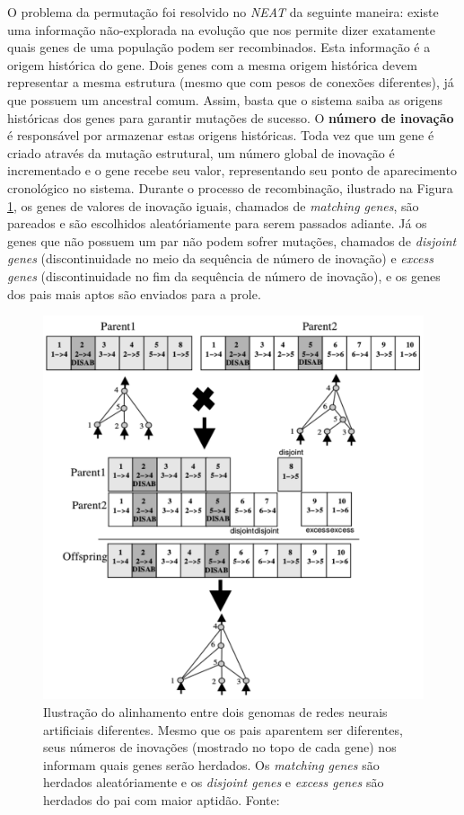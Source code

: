 O problema da permutação foi resolvido no \textit{NEAT} da seguinte maneira:
existe uma informação não-explorada na evolução que nos permite dizer exatamente
quais genes de uma população podem ser recombinados. Esta informação é a origem
histórica do gene. Dois genes com a mesma origem histórica devem representar a
mesma estrutura (mesmo que com pesos de conexões diferentes), já que possuem um
ancestral comum. Assim, basta que o sistema saiba as origens históricas dos
genes para garantir mutações de sucesso.  O \textbf{número de inovação} é
responsável por armazenar estas origens históricas.  Toda vez que um gene é
criado através da mutação estrutural, um número global de inovação é
incrementado e o gene recebe seu valor, representando seu ponto de aparecimento
cronológico no sistema.  Durante o processo de recombinação, ilustrado na Figura
\ref{fig:neat-innovation-matchup}, os genes de valores de inovação iguais,
chamados de \textit{matching genes}, são pareados e são escolhidos
aleatóriamente para serem passados adiante. Já os genes que não possuem um par
não podem sofrer mutações, chamados de \textit{disjoint genes} (discontinuidade
no meio da sequência de número de inovação) e \textit{excess genes}
(discontinuidade no fim da sequência de número de inovação), e os genes dos pais
mais aptos são enviados para a prole.

\begin{figure}[H]
\centering
\includegraphics[width=\textwidth]{fig/neat-crossover-example.pdf}
\caption{Ilustração do alinhamento entre dois genomas de redes neurais
artificiais diferentes. Mesmo que os pais aparentem ser diferentes, seus números
de inovações (mostrado no topo de cada gene) nos informam quais genes serão
herdados. Os \textit{matching genes} são herdados aleatóriamente e os
\textit{disjoint genes} e \textit{excess genes} são herdados do pai com maior
aptidão. Fonte: \cite{stanley:ec02}}
\label{fig:neat-innovation-matchup}
\end{figure}

